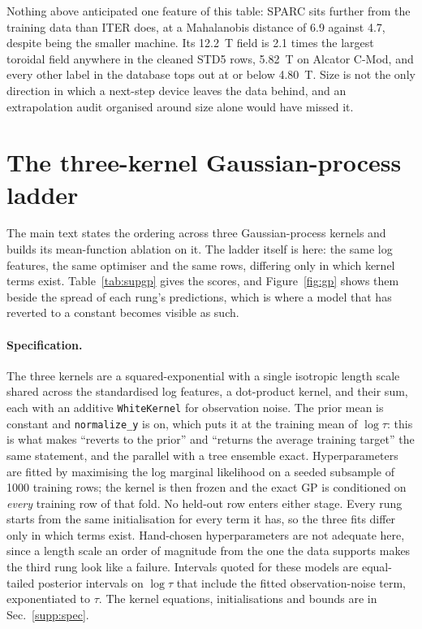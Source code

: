 \documentclass[12pt,letterpaper]{article}
\begin{document}
Nothing above anticipated one feature of this table: SPARC sits further from
the training data than ITER does, at a Mahalanobis distance of 6.9 against 4.7,
despite being the smaller machine. Its \SI{12.2}{\tesla} field is 2.1 times the
largest toroidal field anywhere in the cleaned STD5 rows, \SI{5.82}{\tesla} on
Alcator C-Mod, and every other label in the database tops out at or below
\SI{4.80}{\tesla}. Size is not the only direction in which a next-step device
leaves the data behind, and an extrapolation audit organised around size alone
would have missed it.

\section{The three-kernel Gaussian-process ladder}
\label{supp:gpladder}

The main text states the ordering across three Gaussian-process kernels and
builds its mean-function ablation on it. The ladder itself is here: the same log
features, the same optimiser and the same rows, differing only in which kernel
terms exist. Table~\ref{tab:supgp} gives the scores, and
Figure~\ref{fig:gp} shows them beside the spread of each rung's predictions,
which is where a model that has reverted to a constant becomes visible as such.

\paragraph{Specification.} The three kernels are a squared-exponential with a
single isotropic length scale shared across the standardised log features, a
dot-product kernel, and their sum, each with an additive \texttt{WhiteKernel}
for observation noise. The prior mean is constant and \texttt{normalize\_y} is
on, which puts it at the training mean of $\log\tau$: this is what makes
``reverts to the prior'' and ``returns the average training target'' the same
statement, and the parallel with a tree ensemble exact. Hyperparameters are
fitted by maximising the log marginal likelihood on a seeded subsample of 1000
training rows; the kernel is then frozen and the exact GP is conditioned on
\emph{every} training row of that fold. No held-out row enters either stage.
Every rung starts from the same initialisation for every term it has, so the
three fits differ only in which terms exist. Hand-chosen hyperparameters are not
adequate here, since a length scale an order of magnitude from the one the data
supports makes the third rung look like a failure. Intervals quoted for these
models are equal-tailed posterior intervals on $\log\tau$ that include the
fitted observation-noise term, exponentiated to $\tau$. The kernel equations,
initialisations and bounds are in Sec.~\ref{supp:spec}.
\end{document}
